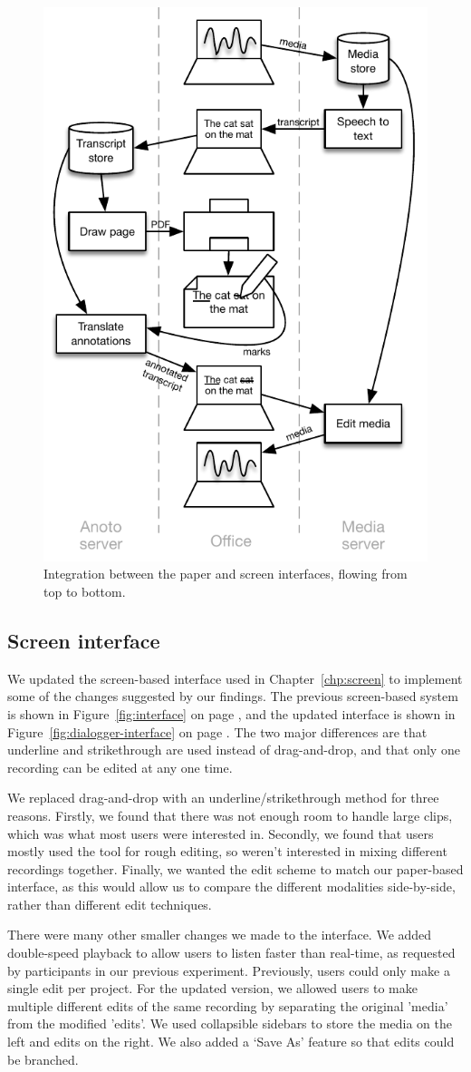 \begin{figure}[ht]
  \centering
  \includegraphics[width=0.5\columnwidth]{figs/uist-sys-diagram}
  \caption{Integration between the paper and screen interfaces, flowing from top to bottom.}
  \label{fig:paper-screen-integration}
\end{figure}

\subsection{Screen interface}
We updated the screen-based interface used in Chapter~\ref{chp:screen} to implement some of the
changes suggested by our findings.
The previous screen-based system is shown in Figure~\ref{fig:interface} on page \pageref{fig:interface}, and the
updated interface is shown in Figure~\ref{fig:dialogger-interface} on page \pageref{fig:dialogger-interface}.
The two major differences are that underline and strikethrough are used instead of drag-and-drop, and that only one
recording can be edited at any one time.

We replaced drag-and-drop with an underline/strikethrough method for three reasons.  Firstly, we found that there was
not enough room to handle large clips, which was what most users were interested in.  Secondly, we found that users
mostly used the tool for rough editing, so weren't interested in mixing different recordings together.  Finally, we
wanted the edit scheme to match our paper-based interface, as this would allow us to compare the different modalities
side-by-side, rather than different edit techniques.

There were many other smaller changes we made to the interface. We added double-speed playback to allow users to listen
faster than real-time, as requested by participants in our previous experiment. Previously, users could only make a
single edit per project. For the updated version, we allowed users to make multiple different edits of the same
recording by separating the original 'media' from the modified 'edits'. We used collapsible sidebars to store the
media on the left and edits on the right. We also added a
`Save As' feature so that edits could be branched.

